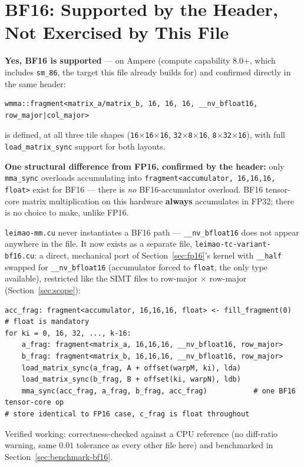 \documentclass[11pt]{article}
\begin{document}
\section{BF16: Supported by the Header, Not Exercised by This File}
\label{sec:bf16}

\textbf{Yes, BF16 is supported} --- on Ampere (compute capability 8.0+, which includes
\texttt{sm\_86}, the target this file already builds for) and confirmed directly in the
same header:
\begin{lstlisting}
wmma::fragment<matrix_a/matrix_b, 16, 16, 16, __nv_bfloat16, row_major|col_major>
\end{lstlisting}
is defined, at all three tile shapes (\texttt{16$\times$16$\times$16},
\texttt{32$\times$8$\times$16}, \texttt{8$\times$32$\times$16}), with full
\texttt{load\_matrix\_sync} support for both layouts.

\textbf{One structural difference from FP16, confirmed by the header:} only
\texttt{mma\_sync} overloads accumulating into \texttt{fragment<accumulator, 16,16,16,
float>} exist for BF16 --- there is \emph{no} BF16-accumulator overload. BF16 tensor-core
matrix multiplication on this hardware \textbf{always} accumulates in FP32; there is no
choice to make, unlike FP16.

\texttt{leimao-mm.cu} never instantiates a BF16 path --- \texttt{\_\_nv\_bfloat16} does
not appear anywhere in the file. It now exists as a separate file,
\texttt{leimao-tc-variant-bf16.cu}: a direct, mechanical port of
Section~\ref{sec:fp16}'s kernel with \texttt{\_\_half} swapped for
\texttt{\_\_nv\_bfloat16} (accumulator forced to \texttt{float}, the only type
available), restricted like the SIMT files to row-major $\times$ row-major
(Section~\ref{sec:scope}):
\begin{lstlisting}
acc_frag: fragment<accumulator, 16,16,16, float> <- fill_fragment(0)   # float is mandatory
for ki = 0, 16, 32, ..., k-16:
    a_frag: fragment<matrix_a, 16,16,16, __nv_bfloat16, row_major>
    b_frag: fragment<matrix_b, 16,16,16, __nv_bfloat16, row_major>
    load_matrix_sync(a_frag, A + offset(warpM, ki), lda)
    load_matrix_sync(b_frag, B + offset(ki, warpN), ldb)
    mma_sync(acc_frag, a_frag, b_frag, acc_frag)           # one BF16 tensor-core op
# store identical to FP16 case, c_frag is float throughout
\end{lstlisting}
Verified working: correctness-checked against a CPU reference (no diff-ratio warning,
same $0.01$ tolerance as every other file here) and benchmarked in
Section~\ref{sec:benchmark-bf16}.
\end{document}

